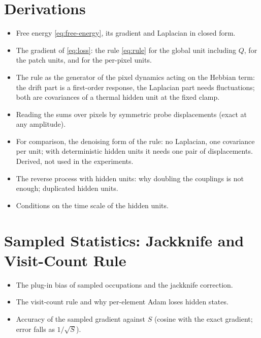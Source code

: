 \documentclass{article}
\newenvironment{plan}
  {\begin{itemize}[leftmargin=1.1em,itemsep=1pt,topsep=2pt,parsep=0pt]\color{plancolor}}
  {\end{itemize}}
\begin{document}



\newpage
\appendix
\onecolumn

\section{Derivations}
\label{app:derivation}
\begin{plan}
  \item Free energy \eqref{eq:free-energy}, its gradient and Laplacian in closed
        form.
  \item The gradient of \eqref{eq:loss}: the rule \eqref{eq:rule} for the global
        unit including $Q$, for the patch units, and for the per-pixel units.
  \item The rule as the generator of the pixel dynamics acting on the Hebbian
        term: the drift part is a first-order response, the Laplacian part
        needs fluctuations; both are covariances of a thermal hidden unit at
        the fixed clamp.
  \item Reading the sums over pixels by symmetric probe displacements (exact
        at any amplitude).
  \item For comparison, the denoising form of the rule: no Laplacian, one
        covariance per unit; with deterministic hidden units it needs one pair
        of displacements. Derived, not used in the experiments.
  \item The reverse process with hidden units: why doubling the couplings is not
        enough; duplicated hidden units.
  \item Conditions on the time scale of the hidden units.
\end{plan}

\section{Sampled Statistics: Jackknife and Visit-Count Rule}
\label{app:sampled}
\begin{plan}
  \item The plug-in bias of sampled occupations and the jackknife correction.
  \item The visit-count rule and why per-element Adam loses hidden states.
  \item Accuracy of the sampled gradient against $S$ (cosine with the exact
        gradient; error falls as $1/\sqrt{S}$).
\end{plan}
\end{document}
